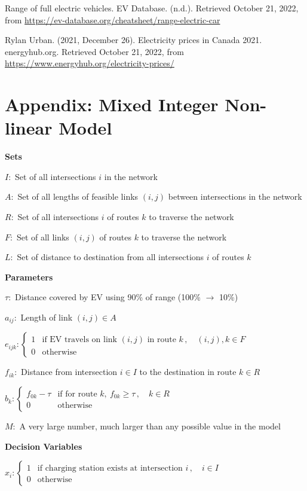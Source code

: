 \documentclass[12pt, fleqn]{article}
\begin{document}
Range of full electric vehicles. EV Database. (n.d.). Retrieved October 21, 2022, from \url{https://ev-database.org/cheatsheet/range-electric-car}

Rylan Urban. (2021, December 26). Electricity prices in Canada 2021. energyhub.org. Retrieved October 21, 2022, from \url{https://www.energyhub.org/electricity-prices/}


\break
\appendix

\section{Appendix: Mixed Integer Non-linear Model}

\textbf{Sets}
\smallskip

$I:$ Set of all intersections $i$ in the network

$A:$ Set of all lengths of feasible links $(i,j)$ between intersections in the network

$R:$ Set of all intersections $i$ of routes $k$ to traverse the network

$F:$ Set of all links $(i,j)$ of routes $k$ to traverse the network

$L:$ Set of distance to destination from all intersections $i$ of routes $k$

\medskip
\textbf{Parameters}
\smallskip

$\tau:$ Distance covered by EV using 90\% of range (100\% $\rightarrow$ 10\%)

$a_{ij}:$ Length of link $(i,j) \in A$

$e_{ijk}: \begin{cases}
        1 & \text{if EV travels on link } (i,j) \text{ in route } k \,, \quad (i,j), k \in F \\
        0 & \text{otherwise}
    \end{cases}$

$f_{ik}:$ Distance from intersection $i \in I$ to the destination in route $k \in R$

$b_{k}: \begin{cases}
        f_{0k}-\tau & \text{if for route } k,\ f_{0k} \geq \tau \,, \quad k \in R \\
        0           & \text{otherwise}
    \end{cases}$

$M:$ A very large number, much larger than any possible value in the model

\medskip
\textbf{Decision Variables}
\smallskip

$x_{i}: \begin{cases}
        1 & \text{if charging station exists at intersection } i \,, \quad i \in I \\
        0 & \text{otherwise}
    \end{cases}$
\end{document}
